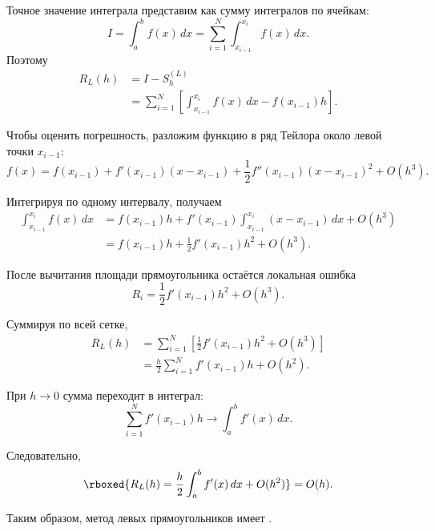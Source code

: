 \documentclass[../final.tex]{subfiles}
\begin{document}
Точное значение интеграла представим как сумму интегралов по ячейкам:
%
\begin{equation*}
    I
    =
    \int_a^b f(x)\,dx
    =
    \sum_{i=1}^{N}
    \int_{x_{i-1}}^{x_i} f(x)\,dx.
\end{equation*}
%
Поэтому
%
\begin{align*}
    R_L(h)
    &=I-S_h^{(L)}\\
    &=
    \sum_{i=1}^{N}
    \left[
        \int_{x_{i-1}}^{x_i} f(x)\,dx
        -f(x_{i-1})h
    \right].
\end{align*}

Чтобы оценить погрешность, разложим функцию в ряд Тейлора около
левой точки $x_{i-1}$:
%
\begin{equation*}
    f(x)
    =
    f(x_{i-1})
    +f'(x_{i-1})(x-x_{i-1})
    +\frac12 f''(x_{i-1})(x-x_{i-1})^2
    +O(h^3).
\end{equation*}

Интегрируя по одному интервалу, получаем
%
\begin{align*}
    \int_{x_{i-1}}^{x_i}f(x)\,dx
    &=
    f(x_{i-1})h
    +f'(x_{i-1})
    \int_{x_{i-1}}^{x_i}(x-x_{i-1})\,dx
    +O(h^3)\\
    &=
    f(x_{i-1})h
    +\frac12 f'(x_{i-1})h^2
    +O(h^3).
\end{align*}

После вычитания площади прямоугольника остаётся локальная ошибка
%
\begin{equation*}
    R_i
    =
    \frac12 f'(x_{i-1})h^2+O(h^3).
\end{equation*}

Суммируя по всей сетке,
%
\begin{align*}
    R_L(h)
    &=
    \sum_{i=1}^{N}
    \left[
        \frac12 f'(x_{i-1})h^2+O(h^3)
    \right]\\
    &=
    \frac{h}{2}
    \sum_{i=1}^{N}f'(x_{i-1})h
    +O(h^2).
\end{align*}

При $h\to0$ сумма переходит в интеграл:
%
\begin{equation*}
    \sum_{i=1}^{N}f'(x_{i-1})h
    \longrightarrow
    \int_a^b f'(x)\,dx.
\end{equation*}

Следовательно,
%
\begin{equation*}
    \rboxed{
    R_L(h)
    =
    \frac{h}{2}\int_a^b f'(x)\,dx
    +O(h^2)
    }
    =O(h).
\end{equation*}

Таким образом, метод левых прямоугольников имеет
.
\end{document}
